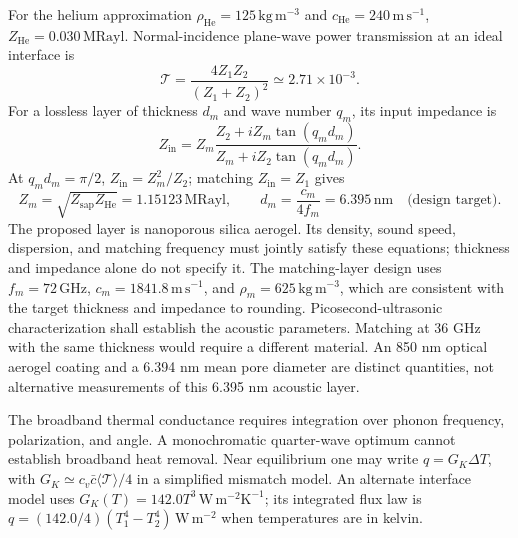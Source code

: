 \documentclass[11pt,a4paper]{article}
\newcommand{\unit}[1]{\,\mathrm{#1}}
\begin{document}
For the helium approximation $\rho_{\mathrm{He}}=125\unit{kg\,m^{-3}}$ and
$c_{\mathrm{He}}=240\unit{m\,s^{-1}}$, $Z_{\mathrm{He}}=0.030\unit{MRayl}$.
Normal-incidence plane-wave power transmission at an ideal interface is
\[
 \mathcal T=\frac{4Z_1Z_2}{(Z_1+Z_2)^2}\simeq2.71\times10^{-3}.
\]
For a lossless layer of thickness $d_m$ and wave number $q_m$, its input impedance is
\[
 Z_{\mathrm{in}}=Z_m\frac{Z_2+iZ_m\tan(q_md_m)}{Z_m+iZ_2\tan(q_md_m)}.
\]
At $q_md_m=\pi/2$, $Z_{\mathrm{in}}=Z_m^2/Z_2$; matching $Z_{\mathrm{in}}=Z_1$ gives
\[
 Z_m=\sqrt{Z_{\mathrm{sap}}Z_{\mathrm{He}}}=1.15123\unit{MRayl},\qquad
 d_m=\frac{c_m}{4f_m}=6.395\unit{nm}\quad\text{(design target)}.
\]
The proposed layer is nanoporous silica aerogel. Its density, sound speed, dispersion, and
matching frequency must jointly satisfy these equations; thickness and impedance alone do
not specify it. The matching-layer design uses $f_m=72\unit{GHz}$, $c_m=1841.8\unit{m\,s^{-1}}$,
and $\rho_m=625\unit{kg\,m^{-3}}$, which are consistent with the target thickness and
impedance to rounding. Picosecond-ultrasonic characterization shall establish the acoustic
parameters. Matching at 36 GHz with the same thickness would require a different material.
An 850 nm optical aerogel coating and a 6.394 nm mean pore diameter are
distinct quantities, not alternative measurements of this 6.395 nm acoustic layer.

The broadband thermal conductance requires integration over phonon frequency, polarization,
and angle. A monochromatic quarter-wave optimum cannot establish broadband heat removal.
Near equilibrium one may write $q=G_K\Delta T$, with
$G_K\simeq c_v\bar c\langle\mathcal T\rangle/4$ in a simplified mismatch model.
An alternate interface model uses $G_K(T)=142.0T^3\unit{W\,m^{-2}K^{-1}}$; its integrated flux law is
$q=(142.0/4)(T_1^4-T_2^4)\unit{W\,m^{-2}}$ when temperatures are in kelvin.

\clearpage
\end{document}
